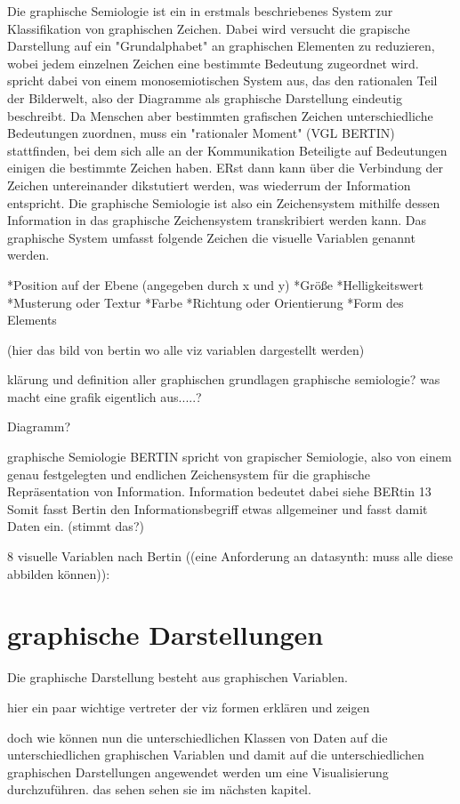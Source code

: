 \documentclass[a4paper, 12pt, onepage, pdftex, headsepline, footsepline]{scrreprt}
\begin{document}
Die graphische Semiologie ist ein in \cite{Bertin} erstmals beschriebenes System zur Klassifikation von graphischen Zeichen.
Dabei wird versucht die grapische Darstellung auf ein "Grundalphabet" an graphischen Elementen zu reduzieren, wobei
jedem einzelnen Zeichen eine bestimmte Bedeutung zugeordnet wird. \citep{Bertin} spricht dabei von einem
monosemiotischen System aus, das den rationalen Teil der Bilderwelt, also der Diagramme
als graphische Darstellung eindeutig beschreibt.
Da Menschen aber bestimmten grafischen Zeichen unterschiedliche Bedeutungen zuordnen, muss ein "rationaler Moment" (VGL BERTIN)
stattfinden, bei dem sich alle an der Kommunikation Beteiligte auf Bedeutungen einigen die bestimmte Zeichen
haben. ERst dann kann über die Verbindung der Zeichen untereinander dikstutiert werden, was wiederrum der
Information entspricht.
Die graphische Semiologie ist also ein Zeichensystem mithilfe dessen Information in das graphische Zeichensystem
transkribiert werden kann.
Das graphische System umfasst folgende Zeichen die visuelle Variablen genannt werden.

*Position auf der Ebene (angegeben durch x und y)
*Größe
*Helligkeitswert
*Musterung oder Textur
*Farbe
*Richtung oder Orientierung
*Form des Elements

(hier das bild von bertin wo alle viz variablen dargestellt werden)

klärung und definition aller graphischen grundlagen
graphische semiologie?
was macht eine grafik eigentlich aus.....?

Diagramm?

graphische Semiologie
BERTIN spricht von grapischer Semiologie, also von einem genau festgelegten und endlichen Zeichensystem für die graphische Repräsentation von Information.
Information bedeutet dabei siehe BERtin 13 Somit fasst Bertin den Informationsbegriff etwas allgemeiner und fasst damit Daten ein. (stimmt das?)

8 visuelle Variablen nach Bertin ((eine Anforderung an datasynth: muss alle diese abbilden können)):

\section{graphische Darstellungen}

Die graphische Darstellung besteht aus graphischen Variablen.

hier ein paar wichtige vertreter der viz formen erklären und zeigen

doch wie können nun die unterschiedlichen Klassen von Daten auf die unterschiedlichen graphischen Variablen und damit
auf die unterschiedlichen graphischen Darstellungen angewendet werden um eine Visualisierung durchzuführen. das sehen
sehen sie im nächsten kapitel.
\end{document}
